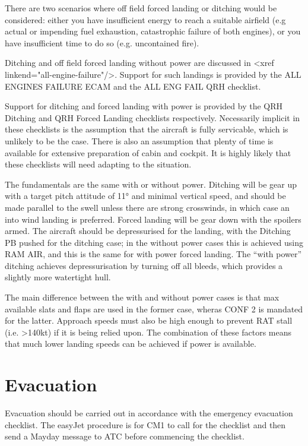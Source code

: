 \documentclass[a5paper,11pt,twoside]{book}
\newcommand{\multicite}[1]{
  \nopagebreak
  \noindent{\footnotesize\color{blue}{[ #1 ]}}
}
\begin{document}
There are two scenarios where off field forced landing or ditching would be
considered: either you have insufficient energy to reach a suitable airfield
(e.g actual or impending fuel exhaustion, catastrophic failure of both engines),
or you have insufficient time to do so (e.g. uncontained fire).

Ditching and off field forced landing without power are discussed in <xref
linkend="all-engine-failure"/>. Support for such landings is provided by the ALL
ENGINES FAILURE ECAM and the ALL ENG FAIL QRH checklist.

Support for ditching and forced landing with power is provided by the QRH
Ditching and QRH Forced Landing checklists respectively. Necessarily implicit in
these checklists is the assumption that the aircraft is fully servicable, which
is unlikely to be the case. There is also an assumption that plenty of time is
available for extensive preparation of cabin and cockpit. It is highly likely
that these checklists will need adapting to the situation.

The fundamentals are the same with or without power. Ditching will be gear up
with a target pitch attitude of 11° and minimal vertical speed, and should be
made parallel to the swell unless there are strong crosswinds, in which case an
into wind landing is preferred. Forced landing will be gear down with the
spoilers armed. The aircraft should be depressurised for the landing, with the
Ditching PB pushed for the ditching case; in the without power cases this is
achieved using RAM AIR, and this is the same for with power forced landing. The
“with power” ditching achieves depressurisation by turning off all bleeds, which
provides a slightly more watertight hull.

The main difference between the with and without power cases is that max
available slats and flaps are used in the former case, wheras CONF 2 is mandated
for the latter. Approach speeds must also be high enough to prevent RAT stall
(i.e. >140kt) if it is being relied upon. The combination of these factors means
that much lower landing speeds can be achieved if power is available.

\multicite{QRH AEP.MISC}

\section{Evacuation}

Evacuation should be carried out in accordance with the emergency evacuation
checklist. The easyJet procedure is for CM1 to call for the checklist and then
send a Mayday message to ATC before commencing the checklist.
\end{document}
